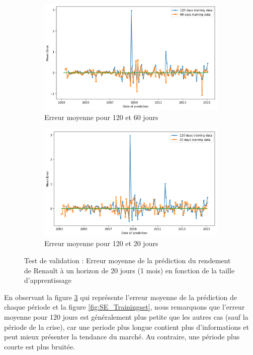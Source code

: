 \begin{figure}[H]
\centering
\begin{subfigure}{.5\textwidth}
\centering
\includegraphics[width=.9\linewidth, scale=0.2]
{plot/ME_Trainingset1.png}
\caption{Erreur moyenne pour 120 et 60 jours}
\label{fig:ME_Ts1}
\end{subfigure}%
\begin{subfigure}{.5\textwidth}
\centering
\includegraphics[width=.9\linewidth, scale=0.2]
{plot/ME_Trainingset2.png}
\caption{Erreur moyenne pour 120 et 20 jours}
\label{fig:ME_Ts2}
\end{subfigure}
\caption{Test de validation : Erreur moyenne de la prédiction du rendement de Renault à un horizon de 20 jours (1 mois) en fonction de la taille d'apprentissage}
\label{fig:ME_Trainingset}
\end{figure}


En observant la figure \ref{fig:ME_Trainingset} qui représente l'erreur moyenne de la prédiction de chaque période et la figure \ref{fig:SE_Trainingset}, nous remarquons que l'erreur moyenne pour 120 jours est généralement plus petite que les autres cas (sauf la période de la crise), car une periode plus longue contient plus d'informations et peut mieux présenter la tendance du marché. Au contraire, une période plus courte est plus bruitée. \\

